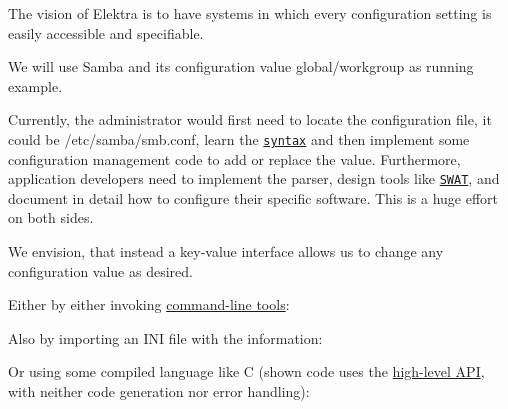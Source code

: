 The vision of Elektra is to have systems in which every configuration setting is easily accessible and specifiable.

We will use Samba and its configuration value {\ttfamily global/workgroup} as running example.

Currently, the administrator would first need to locate the configuration file, it could be {\ttfamily /etc/samba/smb.conf}, learn the \href{https://www.samba.org/samba/docs/current/man-html/smb.conf.5.html}{\tt syntax} and then implement some configuration management code to add or replace the value. Furthermore, application developers need to implement the parser, design tools like \href{https://www.samba.org/samba/docs/old/Samba3-HOWTO/SWAT.html}{\tt S\+W\+AT}, and document in detail how to configure their specific software. This is a huge effort on both sides.

We envision, that instead a key-\/value interface allows us to change any configuration value as desired.

Either by either invoking \hyperlink{doc_help_kdb_md}{command-\/line tools}\+:




Also by importing an I\+NI file with the information\+:




Or using some compiled language like C (shown code uses the \hyperlink{src_libs_highlevel_README_md}{high-\/level A\+PI}, with neither code generation nor error handling)\+:




